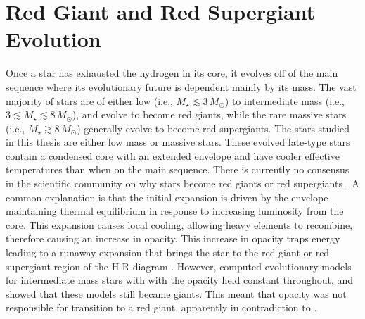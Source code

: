 \section{Red Giant and Red Supergiant Evolution}\label{sec:1.5}
Once a star has exhausted the hydrogen in its core, it evolves off of the main sequence where its evolutionary future is dependent mainly by its mass. The vast majority of stars are of either low (i.e., $M_{\star} \lesssim 3\,M_{\odot}$) to intermediate mass (i.e., $ 3 \lesssim M_{\star} \lesssim 8\,M_{\odot}$), and evolve to become red giants, while the rare massive stars (i.e., $M_{\star} \gtrsim 8\,M_{\odot}$) generally evolve to become red supergiants. The stars studied in this thesis are either low mass or massive stars. These evolved late-type stars contain a condensed core with an extended envelope and have cooler effective temperatures than when on the main sequence. There is currently no consensus in the scientific community on why stars become red giants or red supergiants \citep[e.g.,][]{sugimoto_2000,stancliffe_2009}. A common explanation is that the initial expansion is driven by the envelope maintaining thermal equilibrium in response to increasing luminosity from the core. This expansion causes local cooling, allowing heavy elements to recombine, therefore causing an increase in opacity. This increase in opacity traps energy leading to a runaway expansion that brings the star to the red giant or red supergiant region of the H-R diagram \citep{renzini_1992}. However, \cite{iben_1993} computed evolutionary models for intermediate mass stars with with the opacity held constant throughout, and showed that these models still became giants. This meant that opacity was not responsible for transition to a red giant, apparently in contradiction to \cite{renzini_1992}. 


